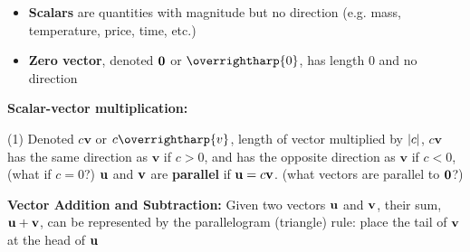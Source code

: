 \documentclass[mathNotesPreamble]{subfiles}
\begin{document}
\begin{defn*}
\begin{itemize}
      \item \textbf{Scalars} are quantities with magnitude but no direction \newline (e.g. mass, temperature, price, time, etc.)
      \item \textbf{Zero vector}, denoted $\mathbf{0}$ or $\overrightharp{0}$, has length $0$ and no direction
    \end{itemize}
  \end{defn*}

  \textbf{Scalar-vector multiplication:}
    \begin{tasks}[label=\textbullet](1)
      \task Denoted $c\mathbf{v}$ or $c\overrightharp{v}$,
      \task length of vector multiplied by ${\left\vert c\right\vert}$,
      \task $c\mathbf v$ has the same direction as $\mathbf v$ if $c>0$, and has the opposite direction as $\mathbf v$ if $c<0$,\newline
            (what if $c=0$?)
      \task ${\mathbf{u}}$ and ${\mathbf{v}}$ are \textbf{parallel} if ${\mathbf{u}}=c{\mathbf{v}}$.\newline
            (what vectors are parallel to $\mathbf{0}$?)
    \end{tasks}

  \pagebreak  
  \textbf{Vector Addition and Subtraction:}\newline
  Given two vectors ${\mathbf{u}}$ and ${\mathbf{v}}$, their sum, ${\mathbf{u}}+{\mathbf{v}}$, can be represented by the parallelogram (triangle) rule: place the tail of ${\mathbf{v}}$ at the head of ${\mathbf{u}}$
    \begin{center}
    \end{center}
\end{document}
